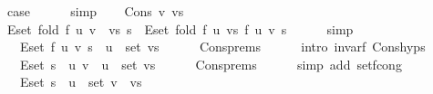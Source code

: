 \begin{isabellebody}
\ {\isacharquery}{\kern0pt}case\isanewline
\ \ \ \ \isamarkupfalse%
\ simp\isanewline
{}\isamarkupfalse%
\isanewline
\ \ \isamarkupfalse%
\ {\isacharparenleft}{\kern0pt}Cons\ v\ vs{\isacharparenright}{\kern0pt}\isanewline
\ \ \isamarkupfalse%
\ {\isachardoublequoteopen}E{\isachardot}{\kern0pt}set\ {\isacharparenleft}{\kern0pt}fold\ {\isacharparenleft}{\kern0pt}f\ u{\isacharparenright}{\kern0pt}\ {\isacharparenleft}{\kern0pt}v\ {\isacharhash}{\kern0pt}\ vs{\isacharparenright}{\kern0pt}\ s{\isacharparenright}{\kern0pt}\ {\isacharequal}{\kern0pt}\ E{\isachardot}{\kern0pt}set\ {\isacharparenleft}{\kern0pt}fold\ {\isacharparenleft}{\kern0pt}f\ u{\isacharparenright}{\kern0pt}\ vs\ {\isacharparenleft}{\kern0pt}f\ u\ v\ s{\isacharparenright}{\kern0pt}{\isacharparenright}{\kern0pt}{\isachardoublequoteclose}\isanewline
\ \ \ \ \isamarkupfalse%
\ simp\isanewline
\ \ \isamarkupfalse%
\ \isamarkupfalse%
\ {\isachardoublequoteopen}{\isachardot}{\kern0pt}{\isachardot}{\kern0pt}{\isachardot}{\kern0pt}\ {\isacharequal}{\kern0pt}\ E{\isachardot}{\kern0pt}set\ {\isacharparenleft}{\kern0pt}f\ u\ v\ s{\isacharparenright}{\kern0pt}\ {\isasymunion}\ {\isacharbraceleft}{\kern0pt}u{\isacharbraceright}{\kern0pt}\ {\isasymtimes}\ set\ vs{\isachardoublequoteclose}\isanewline
\ \ \ \ \isamarkupfalse%
\ Cons{\isachardot}{\kern0pt}prems\isanewline
\ \ \ \ \isamarkupfalse%
\ {\isacharparenleft}{\kern0pt}intro\ invar{\isacharunderscore}{\kern0pt}f\ Cons{\isachardot}{\kern0pt}hyps{\isacharparenright}{\kern0pt}\isanewline
\ \ \isamarkupfalse%
\ \isamarkupfalse%
\ {\isachardoublequoteopen}{\isachardot}{\kern0pt}{\isachardot}{\kern0pt}{\isachardot}{\kern0pt}\ {\isacharequal}{\kern0pt}\ E{\isachardot}{\kern0pt}set\ s\ {\isasymunion}\ {\isacharbraceleft}{\kern0pt}{\isacharparenleft}{\kern0pt}u{\isacharcomma}{\kern0pt}\ v{\isacharparenright}{\kern0pt}{\isacharbraceright}{\kern0pt}\ {\isasymunion}\ {\isacharbraceleft}{\kern0pt}u{\isacharbraceright}{\kern0pt}\ {\isasymtimes}\ set\ vs{\isachardoublequoteclose}\isanewline
\ \ \ \ \isamarkupfalse%
\ Cons{\isachardot}{\kern0pt}prems\isanewline
\ \ \ \ \isamarkupfalse%
\ {\isacharparenleft}{\kern0pt}simp\ add{\isacharcolon}{\kern0pt}\ set{\isacharunderscore}{\kern0pt}f{\isacharunderscore}{\kern0pt}cong{\isacharparenright}{\kern0pt}\isanewline
\ \ \isamarkupfalse%
\ \isamarkupfalse%
\ {\isachardoublequoteopen}{\isachardot}{\kern0pt}{\isachardot}{\kern0pt}{\isachardot}{\kern0pt}\ {\isacharequal}{\kern0pt}\ E{\isachardot}{\kern0pt}set\ s\ {\isasymunion}\ {\isacharbraceleft}{\kern0pt}u{\isacharbraceright}{\kern0pt}\ {\isasymtimes}\ set\ {\isacharparenleft}{\kern0pt}v\ {\isacharhash}{\kern0pt}\ vs{\isacharparenright}{\kern0pt}{\isachardoublequoteclose}\isanewline

\end{isabellebody}
